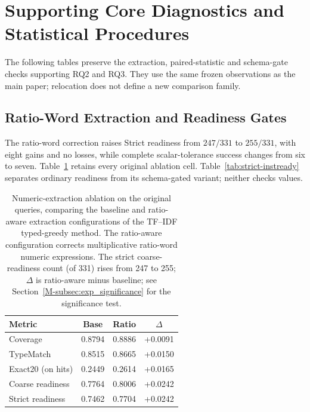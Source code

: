 \section{Supporting Core Diagnostics and Statistical Procedures}
\label{app:core-support}
The following tables preserve the extraction, paired-statistic and schema-gate checks supporting RQ2 and RQ3. They use the same frozen observations as the main paper; relocation does not define a new comparison family.
\subsection{Ratio-Word Extraction and Readiness Gates}
\label{app:extraction-ablation}
The ratio-word correction raises Strict readiness from $247/331$ to $255/331$, with eight gains and no losses, while complete scalar-tolerance success changes from six to seven. Table~\ref{tab:nlp4lp-prefix-postfix} retains every original ablation cell. Table~\ref{tab:strict-instready} separates ordinary readiness from its schema-gated variant; neither checks values.
\begin{table}[t]
  \centering
  \renewcommand{\arraystretch}{1.18}
  \caption{Numeric-extraction ablation on the original queries, comparing the baseline and ratio-aware extraction configurations of the TF--IDF typed-greedy method. The ratio-aware configuration corrects multiplicative ratio-word numeric expressions. The strict coarse-readiness count (of 331) rises from 247 to 255; $\Delta$ is ratio-aware minus baseline; see Section~\ref{M-subsec:exp_significance} for the significance test.}
  \label{tab:nlp4lp-prefix-postfix}
  \small
  \setlength{\tabcolsep}{4pt}
  \begin{tabular}{lccc}
    \toprule
    Metric & Base & Ratio & $\Delta$ \\
    \midrule
Coverage & 0.8794 & 0.8886 & +0.0091 \\
TypeMatch & 0.8515 & 0.8665 & +0.0150 \\
Exact20 (on hits) & 0.2449 & 0.2614 & +0.0165 \\
Coarse readiness & 0.7764 & 0.8006 & +0.0242 \\
Strict readiness & 0.7462 & 0.7704 & +0.0242 \\
    \bottomrule
  \end{tabular}
\end{table}
